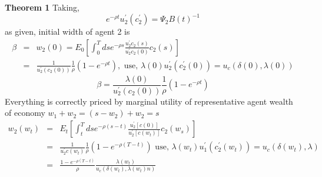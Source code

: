 \documentclass[]{article}
\begin{document}
\textbf{Theorem 1}
Taking,
\begin{equation*}
e^{-\rho t} u_2^\prime(c_2^\prime) = \Psi_2 B(t)^{-1}
\end{equation*}
as given, initial width of agent 2 is 
\begin{eqnarray*}
\beta &=& w_2(0) = E_0\left[\int_0^T ds e^{-\rho s} \frac{u_2^\prime c_2(s)}{u_2^\prime c_2(0)}c_2(s)\right]\\
&=& \frac{1}{u_2^\prime(c_2(0))} \frac{1}{\rho} (1-e^{-\rho t}), \mbox{  use, } \lambda(0) u_2^\prime(c_2^\prime(0)) = u_c(\delta(0), \lambda(0))
\end{eqnarray*}
\begin{equation}
\beta = \frac{\lambda(0)}{u_2^\prime(c_2(0))} \frac{1}{\rho} (1-e^{-\rho t}) \tag{24}
\end{equation}
Everything is correctly priced by marginal utility of representative agent wealth of economy $w_1+w_2 = (s-w_2)+w_2 = s$
\begin{eqnarray*}
w_2(w_t)&=& E_t\left[\int_t^T ds e^{-\rho (s-t)}\frac{u_2^\prime[c(0)]}{u_2^\prime[c(w_t)]} c_2(w_s)\right]\\
&=& \frac{1}{u_2^\prime c(w_t)} \frac{1}{\rho} (1-e^{-\rho (T-t)}) \mbox{ use, } \lambda(w_t)u_1^\prime(c_2^\prime(w_t)) = u_c(\delta(w_t), \lambda)\\
&=&\frac{1-e^{-\rho(T-t)}}{\rho} \frac{\lambda (w_t)}{u_c(\delta(w_t),\lambda(w_t)n)}
\end{eqnarray*}
\end{document}
